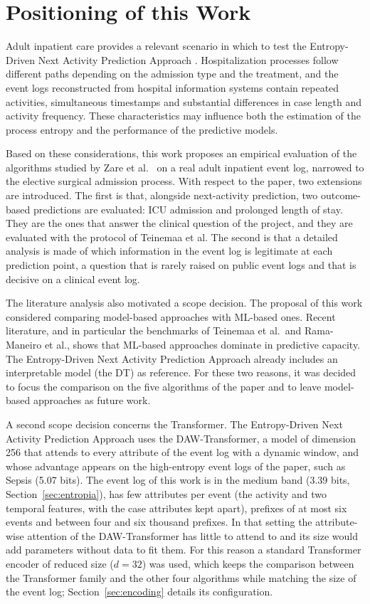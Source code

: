 \section{Positioning of this Work}

Adult inpatient care provides a relevant scenario in which to test the Entropy-Driven Next Activity Prediction Approach \cite{zare2025}. Hospitalization processes follow different paths depending on the admission type and the treatment, and the event logs reconstructed from hospital information systems contain repeated activities, simultaneous timestamps and substantial differences in case length and activity frequency. These characteristics may influence both the estimation of the process entropy and the performance of the predictive models.

Based on these considerations, this work proposes an empirical evaluation of the algorithms studied by Zare et al.\ \cite{zare2025} on a real adult inpatient event log, narrowed to the elective surgical admission process. With respect to the paper, two extensions are introduced. The first is that, alongside next-activity prediction, two outcome-based predictions are evaluated: ICU admission and prolonged length of stay. They are the ones that answer the clinical question of the project, and they are evaluated with the protocol of Teinemaa et al. The second is that a detailed analysis is made of which information in the event log is legitimate at each prediction point, a question that is rarely raised on public event logs and that is decisive on a clinical event log.

The literature analysis also motivated a scope decision. The proposal of this work considered comparing model-based approaches with ML-based ones. Recent literature, and in particular the benchmarks of Teinemaa et al.\ and Rama-Maneiro et al., shows that ML-based approaches dominate in predictive capacity. The Entropy-Driven Next Activity Prediction Approach \cite{zare2025} already includes an interpretable model (the DT) as reference. For these two reasons, it was decided to focus the comparison on the five algorithms of the paper and to leave model-based approaches as future work.

A second scope decision concerns the Transformer. The Entropy-Driven Next Activity Prediction Approach \cite{zare2025} uses the DAW-Transformer, a model of dimension 256 that attends to every attribute of the event log with a dynamic window, and whose advantage appears on the high-entropy event logs of the paper, such as Sepsis (5.07 bits). The event log of this work is in the medium band (3.39 bits, Section~\ref{sec:entropia}), has few attributes per event (the activity and two temporal features, with the case attributes kept apart), prefixes of at most six events and between four and six thousand prefixes. In that setting the attribute-wise attention of the DAW-Transformer has little to attend to and its size would add parameters without data to fit them. For this reason a standard Transformer encoder of reduced size ($d = 32$) was used, which keeps the comparison between the Transformer family and the other four algorithms while matching the size of the event log; Section~\ref{sec:encoding} details its configuration.

